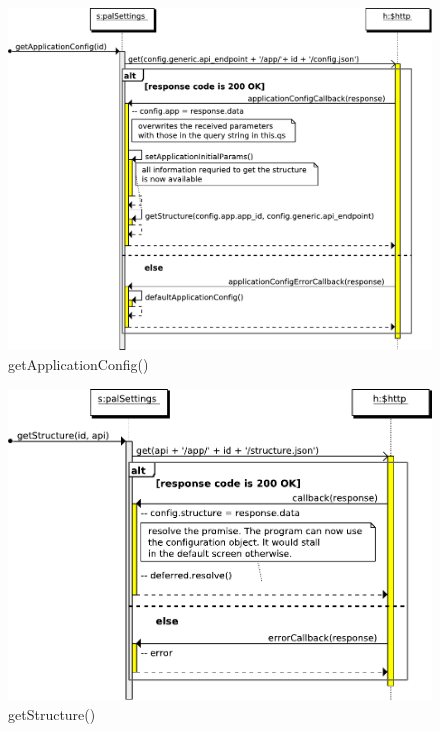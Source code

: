 \begin{figure}[htb]
    \centering
    \includegraphics{figures/design/seqdia/palSettings-getApplicationConfig.pdf}
    \caption{getApplicationConfig()}
    \label{fig:design-seqdia-palSettings-getApplicationConfig}
\end{figure}


\begin{figure}[htb]
    \centering
    \includegraphics{figures/design/seqdia/palSettings-getStructure.pdf}
    \caption{getStructure()}
    \label{fig:design-seqdia-palSettings-getStructure}
\end{figure}


